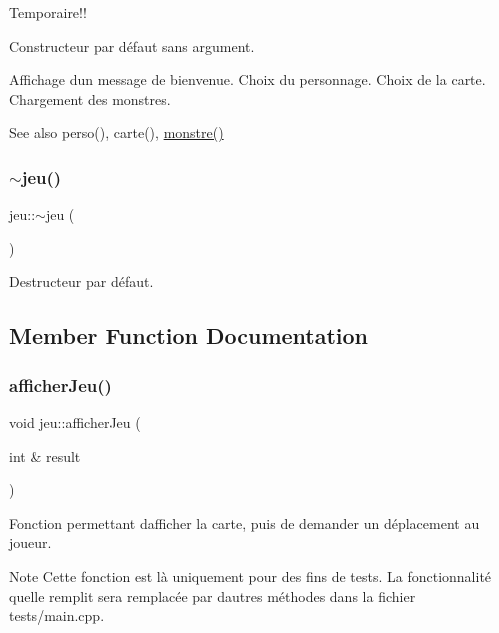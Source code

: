 Temporaire!! 

Constructeur par défaut sans argument.

Affichage d\textquotesingle{}un message de bienvenue. Choix du personnage. Choix de la carte. Chargement des monstres.

\begin{DoxySeeAlso}{See also}
perso(), carte(), \hyperlink{classmonstre}{monstre()} 
\end{DoxySeeAlso}
\mbox{\label{classjeu_a55385a33ef40e0579eb3a3634566c4a8}} 
\subsubsection{\texorpdfstring{$\sim$jeu()}{~jeu()}}
{\footnotesize\ttfamily jeu\+::$\sim$jeu (\begin{DoxyParamCaption}{ }\end{DoxyParamCaption})}



Destructeur par défaut. 



\subsection{Member Function Documentation}
\mbox{\label{classjeu_a834e8a14bd0324c88b2de777a6bdf30f}} 
\subsubsection{\texorpdfstring{afficher\+Jeu()}{afficherJeu()}}
{\footnotesize\ttfamily void jeu\+::afficher\+Jeu (\begin{DoxyParamCaption}\item[{int \&}]{result }\end{DoxyParamCaption})}



Fonction permettant d\textquotesingle{}afficher la carte, puis de demander un déplacement au joueur. 

\begin{DoxyNote}{Note}
Cette fonction est là uniquement pour des fins de tests. La fonctionnalité qu\textquotesingle{}elle remplit sera remplacée par d\textquotesingle{}autres méthodes dans la fichier {\ttfamily tests/main.\+cpp}. 
\end{DoxyNote}
\mbox{\label{classjeu_a6bc1f7cfd93bdc33fc9f841ec3f5f80f}} 
